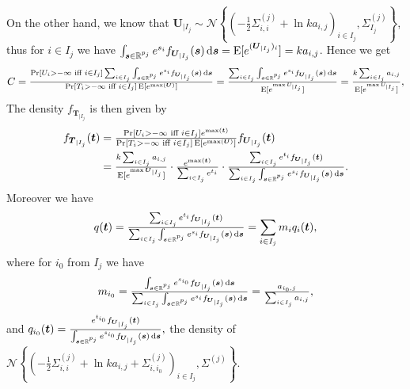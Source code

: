 \documentclass[
]{article}
\begin{document}
On the other hand, we know that
\(\boldsymbol{U}_{\mid I_j} \sim \mathcal{N}\left\{(-\tfrac{1}{2} \Sigma^{(j)}_{i,i} +\ln k a_{i,j})_{i \in I_j}, \Sigma^{(j)}_{I_j}\right\}\),
thus for \(i \in I_j\) we have
\(\int_{\boldsymbol{s} \in \mathbb{R}^{p_j}} e^{s_i} f_{\boldsymbol{U}_{\mid I_j} } (\boldsymbol{s})\, \textnormal{d}\boldsymbol{s}=\operatorname{E}[e^{(\boldsymbol{U}_{\mid I_j})_i}]=ka_{i,j}\).
Hence we get \[
C=\tfrac{\Pr[U_i>-\infty \text{ iff } i \in I_j] \sum_{i \in I_j}  \int_{\boldsymbol{s} \in \mathbb{R}^{p_j}} e^{s_i} f_{\boldsymbol{U}_{\mid I_j}} (\boldsymbol{s})\, \textnormal{d}\boldsymbol{s} }{\Pr[T_i>-\infty \text{ iff } i \in I_j] \operatorname{E}[e^{\max (\boldsymbol{U})}] }
=\tfrac{\sum_{i \in I_j}  \int_{\boldsymbol{s} \in \mathbb{R}^{p_j}} e^{s_i} f_{\boldsymbol{U}_{\mid I_j}} (\boldsymbol{s})\, \textnormal{d}\boldsymbol{s}}{\operatorname{E}[e^{\max U_{\mid I_j}}]}
=\tfrac{k\sum_{i \in I_j} a_{i,j}}{\operatorname{E}[e^{\max U_{\mid I_j}}]},
\] The density \(f_{\boldsymbol{T}_{\mid I_j}}\) is then given by \[
\begin{aligned}
f_{\boldsymbol{T}_{\mid I_j}}(\boldsymbol{t})
&=\tfrac{\Pr[U_i>-\infty \text{ iff } i \in I_j] e^{\max( \boldsymbol{t})}}{\Pr[T_i>-\infty \text{ iff } i \in I_j] \operatorname{E}[e^{\max (\boldsymbol{U})}] } f_{\boldsymbol{U}_{\mid I_j}}(\boldsymbol{t})\\
&=  \tfrac{k\sum_{i \in I_j} a_{i,j}}{\operatorname{E}[e^{\max\boldsymbol{U}_{\mid I_j}}]}   \cdot  \tfrac{e^{\max (\boldsymbol{t})}}{ \sum_{i \in I_j} e^{t_i}} \cdot  \tfrac{\sum_{i \in I_j}  e^{t_i} f_{\boldsymbol{U}_{\mid I_j}} (\boldsymbol{t}) }{\sum_{i \in I_j}  \int_{\boldsymbol{s} \in \mathbb{R}^{p_j}} e^{s_i} f_{\boldsymbol{U}_{\mid I_j}} (\boldsymbol{s})\, \textnormal{d}\boldsymbol{s}}.
\end{aligned}
\] Moreover we have \[
q(\boldsymbol{t})
=\tfrac{\sum_{i \in I_j}  e^{t_i} f_{\boldsymbol{U}_{\mid I_j}} (\boldsymbol{t}) }{\sum_{i \in I_j}  \int_{\boldsymbol{s} \in \mathbb{R}^{p_j}} e^{s_i} f_{\boldsymbol{U}_{\mid I_j}} (\boldsymbol{s})\, \textnormal{d}\boldsymbol{s}}
=\sum_{i \in I_j} m_i q_{i}(\boldsymbol{t}),
\] where for \(i_{0}\) from \(I_j\) we have \[
m_{i_0}=\tfrac{\int_{\boldsymbol{s} \in \mathbb{R}^{p_j}} e^{s_{i_0}} f_{\boldsymbol{U}_{\mid I_j}} (\boldsymbol{s}) \, \textnormal{d}\boldsymbol{s}}{\sum_{i \in I_j}  \int_{\boldsymbol{s} \in \mathbb{R}^{p_j}} e^{s_i} f_{\boldsymbol{U}_{\mid I_j}} (\boldsymbol{s}) \, \textnormal{d}\boldsymbol{s}}
=\tfrac{a_{i_0,j}}{\sum_{i \in I_j} a_{i,j}},
\] and
\(q_{i_0}(\boldsymbol{t})=\tfrac{e^{t_{i_0}} f_{\boldsymbol{U}_{\mid I_j}} (\boldsymbol{t})}{\int_{\boldsymbol{s} \in \mathbb{R}^{p_j}} e^{s_{i_0}} f_{\boldsymbol{U}_{\mid I_j}} (\boldsymbol{s}) \, \textnormal{d}\boldsymbol{s}},\)
the density of
\(\mathcal{N}\left\{(-\tfrac{1}{2} \Sigma^{(j)}_{i,i} +\ln k a_{i,j}+\Sigma^{(j)}_{i,i_0})_{i \in I_j}, \Sigma^{(j)}\right\}\).
\end{document}
